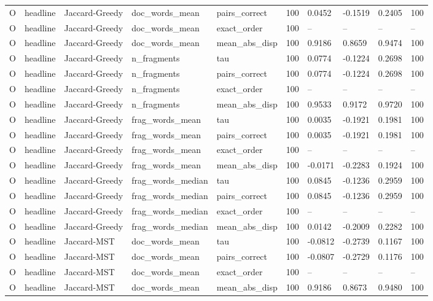 \begin{table}[t]
{\begin{tabular}{llllllllll}
O & headline & Jaccard-Greedy & doc\_words\_mean & pairs\_correct & 100 & 0.0452 & -0.1519 & 0.2405 & 100 \\
O & headline & Jaccard-Greedy & doc\_words\_mean & exact\_order & 100 & -- & -- & -- & -- \\
O & headline & Jaccard-Greedy & doc\_words\_mean & mean\_abs\_disp & 100 & 0.9186 & 0.8659 & 0.9474 & 100 \\
O & headline & Jaccard-Greedy & n\_fragments & tau & 100 & 0.0774 & -0.1224 & 0.2698 & 100 \\
O & headline & Jaccard-Greedy & n\_fragments & pairs\_correct & 100 & 0.0774 & -0.1224 & 0.2698 & 100 \\
O & headline & Jaccard-Greedy & n\_fragments & exact\_order & 100 & -- & -- & -- & -- \\
O & headline & Jaccard-Greedy & n\_fragments & mean\_abs\_disp & 100 & 0.9533 & 0.9172 & 0.9720 & 100 \\
O & headline & Jaccard-Greedy & frag\_words\_mean & tau & 100 & 0.0035 & -0.1921 & 0.1981 & 100 \\
O & headline & Jaccard-Greedy & frag\_words\_mean & pairs\_correct & 100 & 0.0035 & -0.1921 & 0.1981 & 100 \\
O & headline & Jaccard-Greedy & frag\_words\_mean & exact\_order & 100 & -- & -- & -- & -- \\
O & headline & Jaccard-Greedy & frag\_words\_mean & mean\_abs\_disp & 100 & -0.0171 & -0.2283 & 0.1924 & 100 \\
O & headline & Jaccard-Greedy & frag\_words\_median & tau & 100 & 0.0845 & -0.1236 & 0.2959 & 100 \\
O & headline & Jaccard-Greedy & frag\_words\_median & pairs\_correct & 100 & 0.0845 & -0.1236 & 0.2959 & 100 \\
O & headline & Jaccard-Greedy & frag\_words\_median & exact\_order & 100 & -- & -- & -- & -- \\
O & headline & Jaccard-Greedy & frag\_words\_median & mean\_abs\_disp & 100 & 0.0142 & -0.2009 & 0.2282 & 100 \\
O & headline & Jaccard-MST & doc\_words\_mean & tau & 100 & -0.0812 & -0.2739 & 0.1167 & 100 \\
O & headline & Jaccard-MST & doc\_words\_mean & pairs\_correct & 100 & -0.0807 & -0.2729 & 0.1176 & 100 \\
O & headline & Jaccard-MST & doc\_words\_mean & exact\_order & 100 & -- & -- & -- & -- \\
O & headline & Jaccard-MST & doc\_words\_mean & mean\_abs\_disp & 100 & 0.9186 & 0.8673 & 0.9480 & 100 \\

\end{tabular}}
\end{table}
